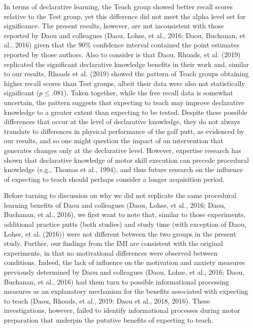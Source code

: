 \documentclass[
  english,
  man,floatsintext]{apa7}
\begin{document}
In terms of declarative learning, the Teach group showed better recall scores relative to the Test group, yet this difference did not meet the alpha level set for significance. The present results, however, are not inconsistent with those reported by Daou and colleagues (Daou, Lohse, et al., 2016; Daou, Buchanan, et al., 2016) given that the \(90\%\) confidence interval contained the point estimates reported by those authors. Also to consider is that Daou, Rhoads, et al. (2019) replicated the significant declarative knowledge benefits in their work and, similar to our results, Rhoads et al. (2019) showed the pattern of Teach groups obtaining higher recall scores than Test groups, albeit their data were also not statistically significant (\(p \leq .081\)). Taken together, while the free recall data is somewhat uncertain, the pattern suggests that expecting to teach may improve declarative knowledge to a greater extent than expecting to be tested. Despite these possible differences that occur at the level of declarative knowledge, they do not always translate to differences in physical performance of the golf putt, as evidenced by our results, and so one might question the impact of an intervention that generates changes only at the declarative level. However, expertise research has shown that declarative knowledge of motor skill execution can precede procedural knowledge (e.g., Thomas et al., 1994), and thus future research on the influence of expecting to teach should perhaps consider a longer acquisition period.

Before turning to discussion on why we did not replicate the same procedural learning benefits of Daou and colleagues (Daou, Lohse, et al., 2016; Daou, Buchanan, et al., 2016), we first want to note that, similar to those experiments, additional practice putts (both studies) and study time (with exception of Daou, Lohse, et al. (2016)) were not different between the two groups in the present study. Further, our findings from the IMI are consistent with the original experiments, in that no motivational differences were observed between conditions. Indeed, the lack of influence on the motivation and anxiety measures previously determined by Daou and colleagues (Daou, Lohse, et al., 2016; Daou, Buchanan, et al., 2016) had them turn to possible informational processing measures as an explanatory mechanism for the benefits associated with expecting to teach (Daou, Rhoads, et al., 2019; Daou et al., 2018, 2016). These investigations, however, failed to identify informational processes during motor preparation that underpin the putative benefits of expecting to teach.
\end{document}
